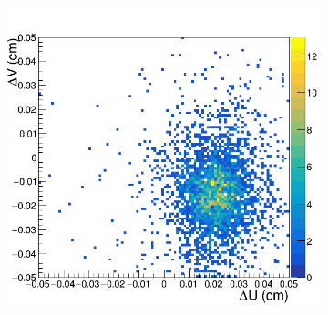 \begin{figure}[h!]
\centering
 \begin{subfigure}[l]{.45\textwidth}
   \centering
   \includegraphics[width=\linewidth]{thesis_figures/alignment/Run_3211_before/square/MX1.png}


\end{subfigure}
\end{figure}
